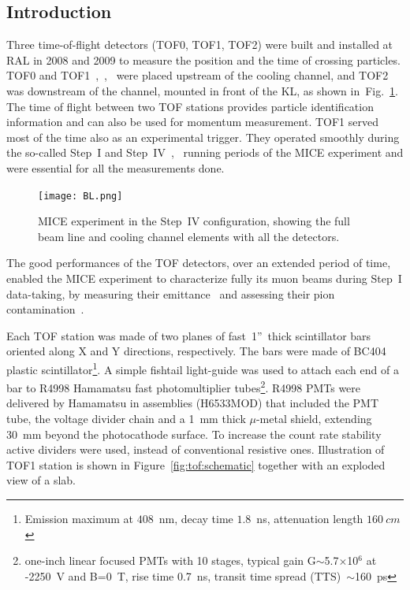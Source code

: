 
\subsection{Introduction}
\label{SubSect:TOF_Intro}

Three time-of-flight detectors (TOF0, TOF1, TOF2) were built and
installed at RAL in 2008 and 2009 to measure the position and the time
of crossing particles.  TOF0 and
TOF1~\cite{NOTE145},~\cite{NOTE241},~\cite{2010NIMPA.615...14B} were
placed upstream of the cooling channel, and TOF2~\cite{NOTE286} was
downstream of the channel, mounted in front of the KL, as shown
in~Fig.~\ref{fig:BL}.  The time of flight between two TOF stations
provides particle identification information and can also be used for
momentum measurement. TOF1 served most of the time also as an
experimental trigger. They operated smoothly during the so-called
Step~I and Step~IV~\cite{Rajaram:2015bra},~\cite{2015ehep.confE.521B}
running periods of the MICE experiment and were essential for all the
measurements done.

\begin{figure}[!ht]
  \begin{center}
    \texttt{[image: BL.png]}
    \caption{MICE experiment in the Step~IV configuration, showing the full beam line and cooling channel elements with all the detectors.}
    \label{fig:BL}
  \end{center}
\end{figure}

The good performances of the TOF detectors, over an extended period of time,
enabled the MICE experiment to characterize fully its muon beams during
Step~I data-taking, by measuring their emittance~\cite{2013arXiv1306.1509T} and
assessing their pion contamination~\cite{2016JInst..11P3001A}.

Each TOF station was made of two planes of fast~1''~thick scintillator
bars oriented along X and Y directions, respectively. The bars were
made of BC404 plastic scintillator\footnote{Emission maximum at
  $408$~nm, decay time $1.8$~ns, attenuation length $160~cm$}. A
simple fishtail light-guide was used to attach each end of a bar to
R4998 Hamamatsu fast photomultiplier tubes\footnote{one-inch linear
  focused PMTs with 10 stages, typical gain G$\sim$5.7$\times$10$^6$
  at -2250~V and B=0~T, rise time 0.7~ns, transit time spread
  (TTS)~$\sim$160~ps}.  R4998 PMTs were delivered by Hamamatsu in
assemblies (H6533MOD) that included the PMT tube, the voltage divider
chain and a 1~mm thick $\mu$-metal shield, extending 30~mm beyond the
photocathode surface.  To increase the count rate stability active
dividers were used, instead of conventional resistive
ones. Illustration of TOF1 station is shown in
Figure~\ref{fig:tof:schematic} together with an exploded view of a
slab.

